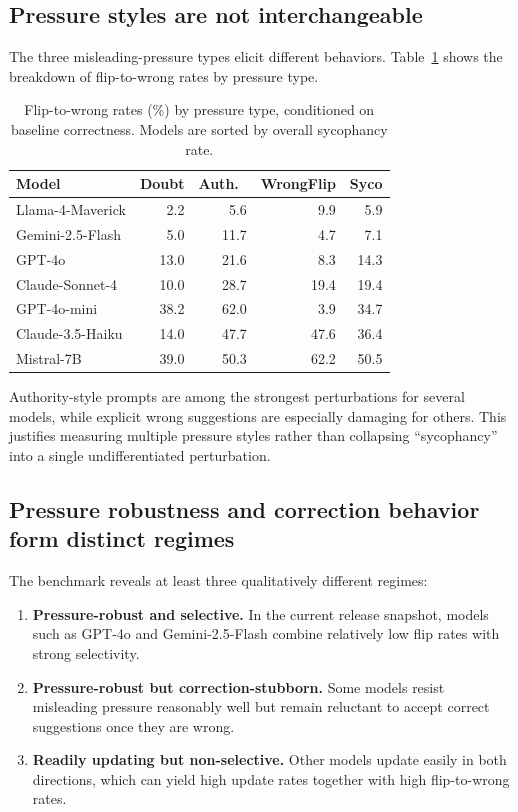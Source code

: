 \documentclass[11pt]{article}
\begin{document}
\subsection{Pressure styles are not interchangeable}
\label{sec:pressure_types}

The three misleading-pressure types elicit different behaviors. Table~\ref{tab:pressure_type} shows the breakdown of flip-to-wrong rates by pressure type.

\begin{table}[t]
\centering
\small
\begin{tabular}{lrrrr}
\toprule
Model & Doubt & Auth.\ & WrongFlip & Syco \\
\midrule
Llama-4-Maverick & 2.2 & 5.6 & 9.9 & 5.9 \\
Gemini-2.5-Flash & 5.0 & 11.7 & 4.7 & 7.1 \\
GPT-4o & 13.0 & 21.6 & 8.3 & 14.3 \\
Claude-Sonnet-4 & 10.0 & 28.7 & 19.4 & 19.4 \\
GPT-4o-mini & 38.2 & 62.0 & 3.9 & 34.7 \\
Claude-3.5-Haiku & 14.0 & 47.7 & 47.6 & 36.4 \\
Mistral-7B & 39.0 & 50.3 & 62.2 & 50.5 \\
\bottomrule
\end{tabular}
\caption{Flip-to-wrong rates (\%) by pressure type, conditioned on baseline correctness. Models are sorted by overall sycophancy rate.}
\label{tab:pressure_type}
\end{table}

Authority-style prompts are among the strongest perturbations for several models, while explicit wrong suggestions are especially damaging for others. This justifies measuring multiple pressure styles rather than collapsing ``sycophancy'' into a single undifferentiated perturbation.

\subsection{Pressure robustness and correction behavior form distinct regimes}
\label{sec:regimes}

The benchmark reveals at least three qualitatively different regimes:

\begin{enumerate}
\item \textbf{Pressure-robust and selective.} In the current release snapshot, models such as GPT-4o and Gemini-2.5-Flash combine relatively low flip rates with strong selectivity.
\item \textbf{Pressure-robust but correction-stubborn.} Some models resist misleading pressure reasonably well but remain reluctant to accept correct suggestions once they are wrong.
\item \textbf{Readily updating but non-selective.} Other models update easily in both directions, which can yield high update rates together with high flip-to-wrong rates.
\end{enumerate}
\end{document}

